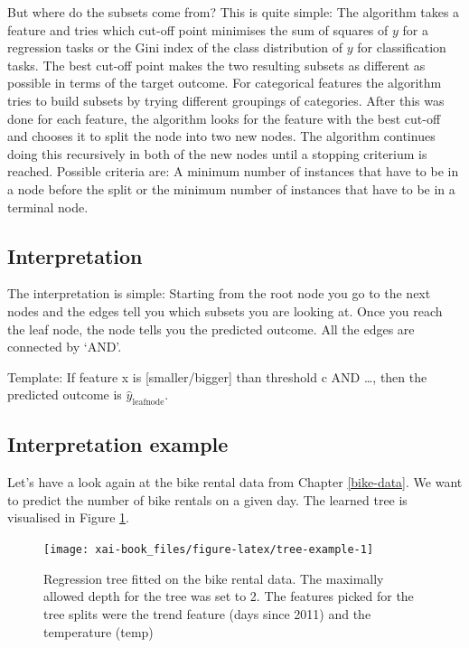 \documentclass[12pt,]{krantz}
\theoremstyle{definition}
\theoremstyle{definition}
\theoremstyle{definition}
\theoremstyle{remark}
\begin{document}
But where do the subsets come from? This is quite simple: The algorithm
takes a feature and tries which cut-off point minimises the sum of
squares of \(y\) for a regression tasks or the Gini index of the class
distribution of \(y\) for classification tasks. The best cut-off point
makes the two resulting subsets as different as possible in terms of the
target outcome. For categorical features the algorithm tries to build
subsets by trying different groupings of categories. After this was done
for each feature, the algorithm looks for the feature with the best
cut-off and chooses it to split the node into two new nodes. The
algorithm continues doing this recursively in both of the new nodes
until a stopping criterium is reached. Possible criteria are: A minimum
number of instances that have to be in a node before the split or the
minimum number of instances that have to be in a terminal node.

\subsection{Interpretation}\label{interpretation-2}

The interpretation is simple: Starting from the root node you go to the
next nodes and the edges tell you which subsets you are looking at. Once
you reach the leaf node, the node tells you the predicted outcome. All
the edges are connected by `AND'.

Template: If feature x is {[}smaller/bigger{]} than threshold c AND
\ldots{}, then the predicted outcome is \(\hat{y}_{\text{leafnode}}\).

\subsection{Interpretation example}\label{interpretation-example-1}

Let's have a look again at the bike rental data from Chapter
\ref{bike-data}. We want to predict the number of bike rentals on a
given day. The learned tree is visualised in Figure
\ref{fig:tree-example}.

\begin{figure}

{\centering \texttt{[image: xai-book\_files/figure-latex/tree-example-1]} 

}

\caption{Regression tree fitted on the bike rental data. The maximally allowed depth for the tree was set to 2. The features picked for the tree splits were the trend feature (days since 2011) and the temperature (temp)}\label{fig:tree-example}
\end{figure}
\end{document}
